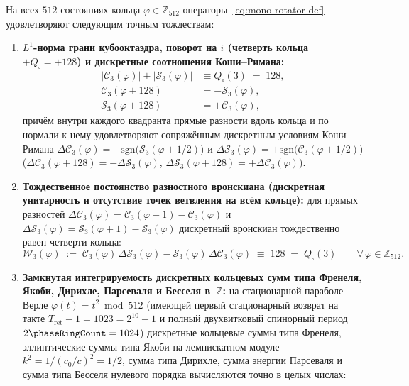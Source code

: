 \begin{theorem}
\label{thm:mono-wronskian-integrals}
На всех $512$ состояниях кольца $\varphi \in \mathbb{Z}_{512}$ операторы~\eqref{eq:mono-rotator-def} удовлетворяют следующим точным тождествам:
\begin{enumerate}[label=\textbf{\arabic*.},noitemsep]
\item \textbf{$L^1$-норма грани кубооктаэдра, поворот на $i$ (четверть кольца $+Q_\square = +128$) и дискретные соотношения Коши--Римана:}
  \begin{align}
    |\mathcal{C}_3(\varphi)| + |\mathcal{S}_3(\varphi)| &\equiv Q_\square(3) \;=\; 128, \label{eq:mono-l1-norm} \\
    \mathcal{C}_3(\varphi + 128) &= -\mathcal{S}_3(\varphi), \label{eq:mono-rotator-shift-c} \\
    \mathcal{S}_3(\varphi + 128) &= +\mathcal{C}_3(\varphi), \label{eq:mono-rotator-shift-s}
  \end{align}
  причём внутри каждого квадранта прямые разности вдоль кольца и по нормали к нему удовлетворяют сопряжённым дискретным условиям Коши--Римана $\Delta\mathcal{C}_3(\varphi) = -\mathrm{sgn}\bigl(\mathcal{S}_3(\varphi + 1/2)\bigr)$ и $\Delta\mathcal{S}_3(\varphi) = +\mathrm{sgn}\bigl(\mathcal{C}_3(\varphi + 1/2)\bigr)$ ($\Delta\mathcal{C}_3(\varphi + 128) = -\Delta\mathcal{S}_3(\varphi)$, $\Delta\mathcal{S}_3(\varphi + 128) = +\Delta\mathcal{C}_3(\varphi)$).
\item \textbf{Тождественное постоянство разностного вронскиана (дискретная унитарность и отсутствие точек ветвления на всём кольце):}
  для прямых разностей $\Delta\mathcal{C}_3(\varphi) = \mathcal{C}_3(\varphi+1) - \mathcal{C}_3(\varphi)$ и $\Delta\mathcal{S}_3(\varphi) = \mathcal{S}_3(\varphi+1) - \mathcal{S}_3(\varphi)$ дискретный вронскиан тождественно равен четверти кольца:
  \begin{equation}
    \label{eq:mono-wronskian}
    \mathcal{W}_3(\varphi) \;:=\; \mathcal{C}_3(\varphi)\,\Delta\mathcal{S}_3(\varphi) - \mathcal{S}_3(\varphi)\,\Delta\mathcal{C}_3(\varphi) \;\equiv\; 128 \;=\; Q_\square(3) \qquad \forall\,\varphi \in \mathbb{Z}_{512}.
  \end{equation}
\item \textbf{Замкнутая интегрируемость дискретных кольцевых сумм типа Френеля, Якоби, Дирихле, Парсеваля и Бесселя в~$\mathbb{Z}$:}
  на стационарной параболе Верле $\varphi(t) = t^2 \bmod 512$ (имеющей первый стационарный возврат на такте $T_{\mathrm{ret}} - 1 = 1023 = 2^{10}-1$ и полный двухвитковый спинорный период $2\phaseRingCount = 1024$) дискретные кольцевые суммы типа Френеля, эллиптические суммы типа Якоби на лемнискатном модуле $k^2 = 1/(c_0/c)^2 = 1/2$, сумма типа Дирихле, сумма энергии Парсеваля и сумма типа Бесселя нулевого порядка вычисляются точно в целых числах:

\end{enumerate}
\end{theorem}
